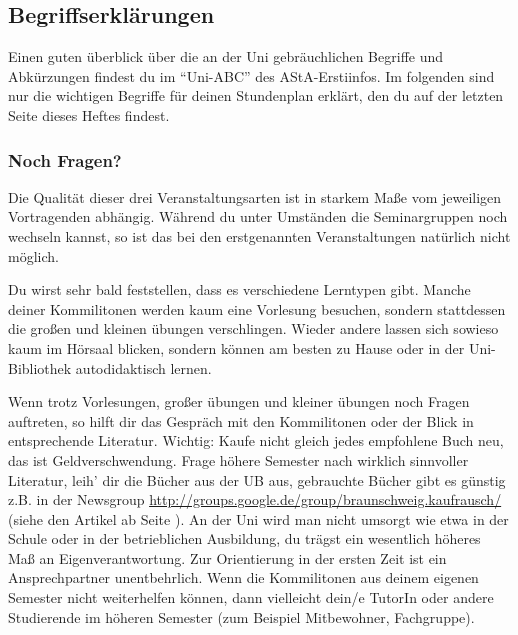 \subsection{Begriffserklärungen}



Einen guten überblick über die an der Uni gebräuchlichen Begriffe und
Abkürzungen findest du im "`Uni-ABC"' des AStA-Erstiinfos. Im folgenden
sind nur die wichtigen Begriffe für deinen Stundenplan erklärt, den du
auf der letzten Seite dieses Heftes findest.




\subsubsection*{Noch Fragen?}

Die Qualität dieser drei Veranstaltungsarten ist in starkem Maße vom
jeweiligen Vortragenden abhängig. Während du unter Umständen die
Seminargruppen noch wechseln kannst, so ist das bei den erstgenannten
Veranstaltungen natürlich nicht möglich.

Du wirst sehr bald feststellen, dass es verschiedene Lerntypen gibt. Manche
deiner Kommilitonen werden kaum eine Vorlesung besuchen, sondern stattdessen die großen
und kleinen übungen verschlingen. Wieder andere lassen sich sowieso kaum im
Hörsaal blicken, sondern können am besten zu Hause oder in der Uni-Bibliothek
autodidaktisch lernen.

Wenn trotz Vorlesungen, großer übungen und kleiner übungen noch Fragen
auftreten, so hilft dir das Gespräch mit den Kommilitonen oder der Blick in
entsprechende Literatur.
Wichtig: Kaufe nicht gleich jedes empfohlene Buch neu,
das ist Geldverschwendung. Frage höhere Semester nach wirklich sinnvoller
Literatur, leih' dir die Bücher aus der UB aus, gebrauchte Bücher gibt es
günstig z.B. in der Newsgroup \url{http://groups.google.de/group/braunschweig.kaufrausch/} (siehe den Artikel
ab Seite \pageref{elekinf}). An der Uni wird man nicht umsorgt wie etwa in der
Schule oder in der betrieblichen Ausbildung, du trägst ein wesentlich höheres
Maß an Eigenverantwortung. Zur Orientierung in der ersten Zeit ist ein
Ansprechpartner unentbehrlich. Wenn die Kommilitonen aus
deinem eigenen Semester nicht weiterhelfen können, dann vielleicht dein/e TutorIn oder andere
Studierende im höheren Semester (zum Beispiel Mitbewohner, Fachgruppe).
